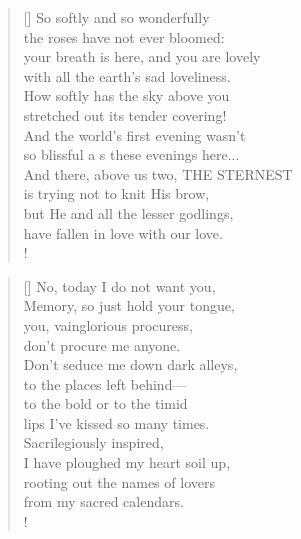\documentclass[]{article}
\begin{document}
\vspace*{0.05\textheight}
\settowidth{\versewidth}{your breath is here, and you are }
\begin{verse}[\versewidth]
So softly and so wonderfully\\
the roses have not ever bloomed:\\
your breath is here, and you are lovely\\
with all the earth's sad loveliness.\\
How softly has the sky above you\\
stretched out its tender covering!\\
And the world's first evening wasn't\\
so blissful a s these evenings here... \\
And there, above us two, THE STERNEST\\
is trying not to knit His brow,\\
but He and all the lesser godlings,\\
have fallen in love with our love. \\!
\end{verse}
\bigskip \bigskip

\settowidth{\versewidth}{No, today I do not want you, }
\begin{verse}[\versewidth]
No, today I do not want you,\\
Memory, so just hold your tongue,\\
you, vainglorious procuress,\\
don't procure me anyone.\\
Don't seduce me down dark alleys,\\
to the places left behind—\\
to the bold or to the timid\\
lips I've kissed so many times.\\
Sacrilegiously inspired,\\
I have ploughed my heart soil up,\\
rooting out the names of lovers\\
from my sacred calendars.\\!
\end{verse}
\newpage
\end{document}
